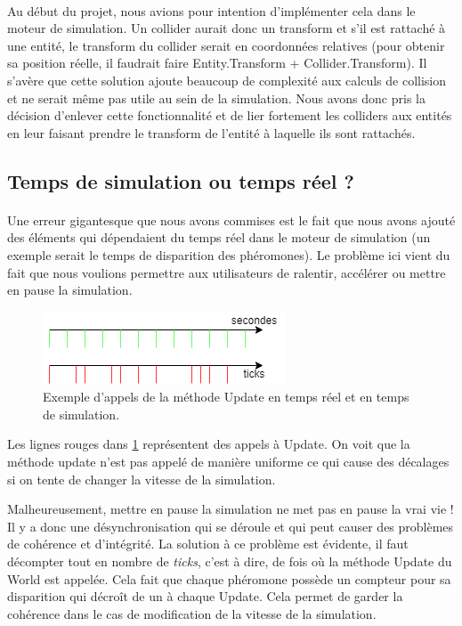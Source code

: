 \documentclass{EPUProjetDi}
\begin{document}
\paragraph{}
Au début du projet, nous avions pour intention d'implémenter cela dans le moteur de simulation. 
Un collider aurait donc un transform et s'il est rattaché à une entité, le transform du collider serait en coordonnées relatives (pour obtenir sa position réelle, il faudrait faire Entity.Transform + Collider.Transform).
Il s'avère que cette solution ajoute beaucoup de complexité aux calculs de collision et ne serait même pas utile au sein de la simulation. Nous avons donc pris la décision d'enlever cette 
fonctionnalité et de lier fortement les colliders aux entités en leur faisant prendre le transform de l'entité à laquelle ils sont rattachés.

\subsection{Temps de simulation ou temps réel ?}
\paragraph{}
Une erreur gigantesque que nous avons commises est le fait que nous avons ajouté des éléments qui dépendaient du temps réel dans le moteur de simulation (un exemple serait le temps de disparition des phéromones).
Le problème ici vient du fait que nous voulions permettre aux utilisateurs de ralentir, accélérer ou mettre en pause la simulation.

\begin{figure}[h]
    \centering
    \includegraphics[scale=1]{ticks_secondes.png}
    \caption{Exemple d'appels de la méthode Update en temps réel et en temps de simulation.}
    \label{fig:ticks_secondes}
\end{figure}

Les lignes rouges dans \ref{fig:ticks_secondes} représentent des appels à Update. On voit que la méthode update n'est pas appelé de manière uniforme ce qui cause des décalages si on tente de changer la vitesse de la simulation.

Malheureusement, mettre en pause la simulation ne met pas en pause la vrai vie ! Il y a donc une désynchronisation qui se déroule et qui peut causer des problèmes de cohérence et d'intégrité.
La solution à ce problème est évidente, il faut décompter tout en nombre de \textit{ticks}, c'est à dire, de fois où la méthode Update du World est appelée. 
Cela fait que chaque phéromone possède un compteur pour sa disparition qui décroît de un à chaque Update. Cela permet de garder la cohérence dans le cas de modification de la vitesse de la simulation.
\end{document}
